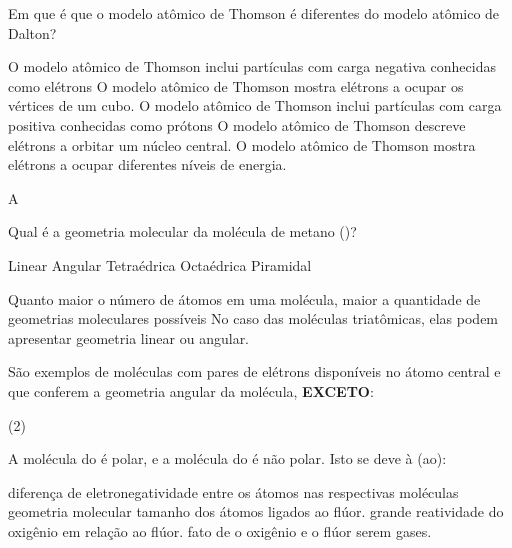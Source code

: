 \documentclass[9qpt]{scrartcl}
\begin{document}
\begin{exercise}[points=1.0]
Em que é que o modelo atômico de Thomson é diferentes do modelo atômico de Dalton?

\begin{choice}
\choice O modelo atômico de Thomson inclui partículas com carga negativa conhecidas como elétrons
\choice O modelo atômico de Thomson mostra elétrons a ocupar os vértices de um cubo.
\choice O modelo atômico de Thomson inclui partículas com carga positiva conhecidas como prótons
\choice O modelo atômico de Thomson descreve elétrons a orbitar um núcleo central.
\choice O modelo atômico de Thomson mostra elétrons a ocupar diferentes níveis de energia.
\end{choice}
\end{exercise}
\begin{solution}
A
\end{solution}





\begin{exercise}[points=1]
Qual é a geometria molecular da molécula de metano ()?

\begin{choice}
\choice Linear
\choice Angular
\choice Tetraédrica
\choice Octaédrica
\choice Piramidal
\end{choice}
\end{exercise}


\begin{exercise}[points=1]
Quanto maior o número de átomos em uma molécula, maior a quantidade de geometrias moleculares possíveis No caso das moléculas triatômicas, elas podem apresentar geometria linear ou angular.

São exemplos de moléculas com pares de elétrons disponíveis no átomo central e que conferem a geometria angular da molécula, \textbf{EXCETO}:


\begin{choice}(2)
\choice {}
\choice {}
\choice {}
\choice {}
\choice {}
\end{choice}
\end{exercise}


\begin{exercise}[points=1]
A molécula do  é polar, e a molécula do  é não polar. Isto se deve à (ao):

\begin{choice}
\choice diferença de eletronegatividade entre os átomos nas respectivas moléculas
\choice  geometria molecular
\choice tamanho dos átomos ligados ao flúor.
\choice grande reatividade do oxigênio em relação ao flúor.
\choice fato de o oxigênio e o flúor serem gases.
\end{choice}
\end{exercise}
\end{document}
